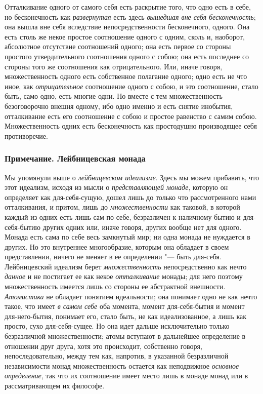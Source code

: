 Отталкивание одного от самого себя есть раскрытие того, что одно есть в
себе, но бесконечность как {\em развернутая} есть здесь
{\em вышедшая вне себя бесконечность}; она вышла вне
себя вследствие непосредственности бесконечного, одного. Она есть столь же
некое простое соотношение одного с одним, сколь и, наоборот, абсолютное
отсутствие соотношений одного; она есть первое со стороны простого
утвердительного соотношения одного с собою; она есть последнее со стороны
того же соотношения как отрицательного. Или, иначе говоря, множественность
одного есть собственное полагание одного; одно есть не что иное, как
{\em отрицательное} соотношение одного с собою, и это
соотношение, стало быть, само одно, есть многие одни. Но вместе с тем
множественность безоговорочно внешня одному, ибо одно именно и есть снятие
инобытия, отталкивание есть его соотношение с собою и простое равенство с
самим собою. Множественность одних есть бесконечность как простодушно
производящее себя противоречие.

\subsubsection[Примечание. Лейбницевская монада]
{Примечание. Лейбницевская монада}

Мы упомянули выше о {\em лейбницевском идеализме}. Здесь
мы можем прибавить, что этот идеализм, исходя из мысли о
{\em представляющей монаде}, которую он определяет как
для-себя-сущую, дошел лишь до только что рассмотренного нами отталкивания,
и притом, лишь до {\em множественности} как таковой, в
которой каждый из одних есть лишь сам по себе, безразличен к наличному
бытию и для-себя-бытию других одних или, иначе говоря, других вообще нет
для одного. Монада есть сама по себе весь замкнутый мир; ни одна монада не
нуждается в других. Но это внутреннее многообразие, которым она обладает в
своем представлении, ничего не меняет в ее определении "--- быть для-себя.
Лейбницевский идеализм берет {\em множественность}
непосредственно как нечто {\em данное} и не постигает
ее как некое {\em отталкивание} монады; для него
поэтому множественность имеется лишь со стороны ее абстрактной внешности.
{\em Атомистика} не обладает понятием идеальности; она
понимает одно не как нечто такое, что имеет {\em в
самом себе} оба момента, момент для-себя-бытия и момент для-него-бытия,
понимает его, стало быть, не как идеализованное, а лишь как просто, сухо
для-себя-сущее. Но она идет дальше исключительно только безразличной
множественности; атомы вступают в дальнейшее определение в отношении друг
друга, хотя это происходит, собственно говоря, непоследовательно, между тем
как, напротив, в указанной безразличной независимости монад множественность
остается как неподвижное {\em основное определение},
так что их соотношение имеет место лишь в монаде монад или в
рассматривающем их философе.


